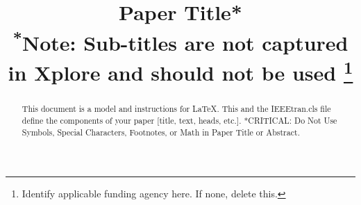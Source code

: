 \documentclass[conference]{IEEEtran}
\begin{document}
\title{Paper Title*\\
{\footnotesize \textsuperscript{*}Note: Sub-titles are not captured in Xplore and
should not be used}
\thanks{Identify applicable funding agency here. If none, delete this.}
}


\maketitle

\begin{abstract}
This document is a model and instructions for \LaTeX.
This and the IEEEtran.cls file define the components of your paper [title, text, heads, etc.]. *CRITICAL: Do Not Use Symbols, Special Characters, Footnotes,
or Math in Paper Title or Abstract.
\end{abstract}
\end{document}
